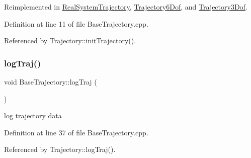 Reimplemented in \hyperlink{class_real_system_trajectory_a41ae049eeff69ea6b9daef8027a142a3}{Real\+System\+Trajectory}, \hyperlink{class_trajectory6_dof_a4e81b667130462a85ce047d4942b794c}{Trajectory6\+Dof}, and \hyperlink{class_trajectory3_dof_ab132d729efaded8c7942d462d69cba62}{Trajectory3\+Dof}.



Definition at line 11 of file Base\+Trajectory.\+cpp.



Referenced by Trajectory\+::init\+Trajectory().

\mbox{\label{class_base_trajectory_a9e24dc7f487ea46621bd231e9d4d995c}} 
\subsubsection{\texorpdfstring{log\+Traj()}{logTraj()}}
{\footnotesize\ttfamily void Base\+Trajectory\+::log\+Traj (\begin{DoxyParamCaption}{ }\end{DoxyParamCaption})\hspace{0.3cm}{\ttfamily [virtual]}}



log trajectory data 



Definition at line 37 of file Base\+Trajectory.\+cpp.



Referenced by Trajectory\+::log\+Traj().

\mbox{\label{class_base_trajectory_a37f0fa46532c754413ee67a846a10624}} 
